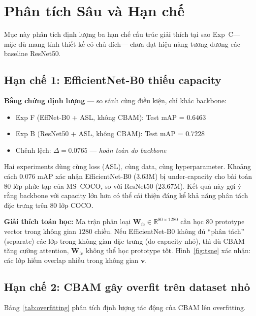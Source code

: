 \documentclass[conference]{IEEEtran}
\begin{document}
\section{Phân tích Sâu và Hạn chế}
\label{sec:analysis}

Mục này phân tích định lượng ba hạn chế cấu trúc giải thích
tại sao Exp~C---mặc dù mang tính thiết kế có chủ đích---
chưa đạt hiệu năng tương đương các baseline ResNet50.

\subsection{Hạn chế 1: EfficientNet-B0 thiếu capacity}

\textbf{Bằng chứng định lượng} --- so sánh cùng điều kiện, chỉ khác backbone:
\begin{itemize}[leftmargin=1.8em]
  \item Exp F (EffNet-B0 + ASL, không CBAM): Test mAP = $0.6463$
  \item Exp B (ResNet50 + ASL, không CBAM): Test mAP = $0.7228$
  \item Chênh lệch: $\Delta = 0.0765$ --- \textit{hoàn toàn do backbone}
\end{itemize}

Hai experiments dùng cùng loss (ASL), cùng data, cùng hyperparameter.
Khoảng cách $0.076$ mAP xác nhận EfficientNet-B0 ($3.63\text{M}$)
bị under-capacity cho bài toán 80 lớp phức tạp của MS~COCO,
so với ResNet50 ($23.67\text{M}$). Kết quả này gợi ý
rằng backbone với capacity lớn hơn có thể cải thiện
đáng kể khả năng phân tách đặc trưng trên 80 lớp COCO.

\textbf{Giải thích toán học:}
Ma trận phân loại $\mathbf{W}_{\text{fc}} \in \mathbb{R}^{80 \times 1280}$
cần học 80 prototype vector trong không gian $1280$ chiều.
Nếu EfficientNet-B0 không đủ ``phân tách'' (separate) các lớp trong không gian đặc trưng
(do capacity nhỏ), thì dù CBAM tăng cường attention, $\mathbf{W}_{\text{fc}}$
không thể học prototype tốt.
Hình~\ref{fig:tsne} xác nhận: các lớp hiếm overlap nhiều trong không gian $\mathbf{v}$.

\subsection{Hạn chế 2: CBAM gây overfit trên dataset nhỏ}

Bảng~\ref{tab:overfitting} phân tích định lượng tác động của CBAM lên overfitting.
\end{document}
